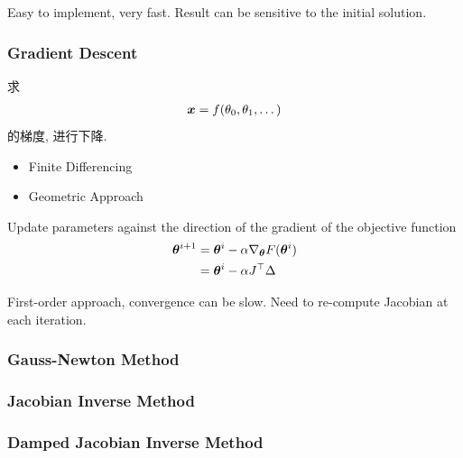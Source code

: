 Easy to implement, very fast. Result can be sensitive to the initial solution.

\subsubsection{Gradient Descent}
求 
\begin{align*}
    {\bm{x}}=f(\theta_0,\theta_1,\dots)
\end{align*}
的梯度, 进行下降. 

\begin{itemize}
    \item Finite Differencing
    \item Geometric Approach
\end{itemize}



Update parameters against the direction of the gradient of the objective function
\begin{align*}
    {\bm{\theta}}^{i+1}&={\bm{\theta}}^i-\alpha \nabla_{\bm{\theta}} F({\bm{\theta}}^i)\\
    &={\bm{\theta}}^i-\alpha J^\top \Delta
\end{align*}

First-order approach, convergence can be slow. Need to re-compute Jacobian at each iteration.

\subsubsection{Gauss-Newton Method}

\subsubsection{Jacobian Inverse Method}

\subsubsection{Damped Jacobian Inverse Method}


